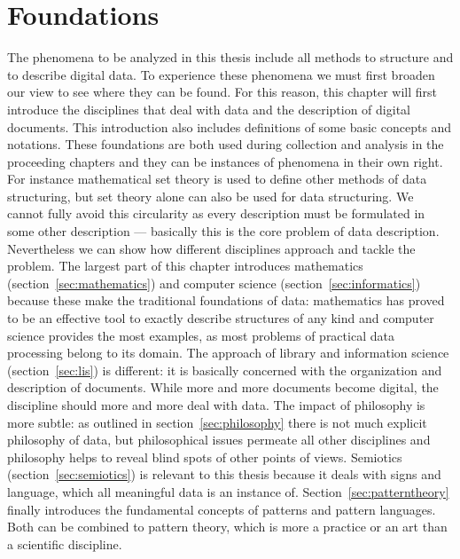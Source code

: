 \chapter{Foundations}
\label{ch:foundations}

The phenomena to be analyzed in this thesis include all methods to structure
and to describe digital data. To experience these phenomena we must first
broaden our view to see where they can be found. For this reason, this chapter
will first introduce the disciplines that deal with data and the description of
digital documents. This introduction also includes definitions of some basic
concepts and notations. These foundations are both used during collection and
analysis in the proceeding chapters and they can be instances of phenomena in
their own right. For instance mathematical set theory is used to define other
methods of data structuring, but set theory alone can also be used for data
structuring. We cannot fully avoid this circularity as every description must
be formulated in some other description --- basically this is the core problem
of data description. Nevertheless we can show how different disciplines
approach and tackle the problem. The largest part of this chapter introduces 
mathematics (section~\ref{sec:mathematics}) and computer science
(section~\ref{sec:informatics}) because these make the traditional foundations
of data: mathematics has proved to be an effective tool to exactly describe
structures of any kind and computer science provides the most examples, as most
problems of practical data processing belong to its domain. The approach of
library and information science (section~\ref{sec:lis}) is different: it is
basically concerned with the organization and description of documents. While
more and more documents become digital, the discipline should more and more
deal with data. The impact of philosophy is more subtle: as outlined in
section~\ref{sec:philosophy} there is not much explicit philosophy of data, but
philosophical issues permeate all other disciplines and philosophy helps to
reveal blind spots of other points of views. Semiotics
(section~\ref{sec:semiotics}) is relevant to this thesis because it deals with
signs and language, which all meaningful data is an instance of.
Section~\ref{sec:patterntheory} finally introduces the fundamental concepts
of patterns and pattern languages.  Both can be combined to pattern theory,
which is more a practice or an art than a scientific discipline.














